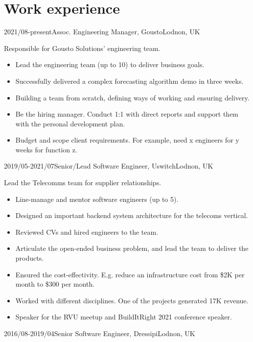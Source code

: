 \documentclass[a4paper]{twentysecondcv-english} %
\begin{document}
\section{Work experience}

\begin{twenty}
	\twentyitem
	    {2021/08-present}{Assoc. Engineering Manager, Gousto}{Lodnon, UK}
    	{Responsible for Gousto Solutions' engineering team.
        	\begin{itemize}
        	      \item Lead the engineering team (up to 10) to deliver business goals.
                \item Successfully delivered a complex forecasting algorithm demo in three weeks.
                \item Building a team from scratch, defining ways of working and ensuring delivery.
                \item Be the hiring manager. Conduct 1:1 with direct reports and support them with the personal development plan.
                \item Budget and scope client requirements. For example, need x engineers for y weeks for function z.
            \end{itemize}}
	\twentyitem
	    {2019/05-2021/07}{Senior/Lead Software Engineer, Uswitch}{Lodnon, UK}
    	{Lead the Telecomms team for supplier relationships.
        	\begin{itemize}
                \item Line-manage and mentor software engineers (up to 5).
                \item Designed an important backend system architecture for the telecoms vertical.
                \item Reviewed CVs and hired engineers to the team.
                \item Articulate the open-ended business problem, and lead the team to deliver the products.
                \item Ensured the cost-effectivity. E.g. reduce an infrastructure cost from \$2K per month to \$300 per month.
                \item Worked with different disciplines. One of the projects generated \textsterling17K revenue.
                \item Speaker for the RVU meetup and BuildItRight 2021 conference speaker.
                \end{itemize}}
	\twentyitem
	    {2016/08-2019/04}{Senior Software Engineer, Dressipi}{Lodnon, UK}

\end{twenty}
\end{document}
